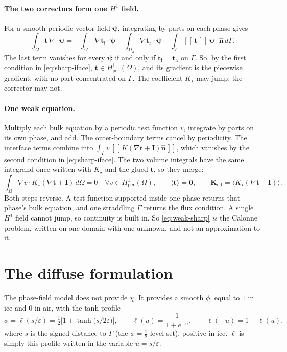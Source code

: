 \documentclass[11pt]{article}
\newcommand{\Om}{\Omega}
\newcommand{\Gam}{\Gamma}
\newcommand{\bn}{\hat{\mathbf n}}
\newcommand{\bI}{\mathbf I}
\newcommand{\bt}{\mathbf t}
\newcommand{\Keff}{\mathbf{K}_{\mathrm{eff}}}
\newcommand{\Hper}{H^1_{\mathrm{per}}(\Om)}
\newcommand{\avg}[1]{\big\langle #1 \big\rangle}
\newcommand{\jump}[1]{[\![\,#1\,]\!]}
\begin{document}
\paragraph{The two correctors form one $H^1$ field.} For a smooth periodic
vector field $\boldsymbol\psi$, integrating by parts on each phase gives
\[
\int_\Om\bt\,\nabla\!\cdot\boldsymbol\psi
=-\int_{\Om_{\mathrm i}}\nabla\bt_{\mathrm i}\cdot\boldsymbol\psi
 -\int_{\Om_{\mathrm a}}\nabla\bt_{\mathrm a}\cdot\boldsymbol\psi
 -\int_\Gam\jump{\bt}\,\boldsymbol\psi\cdot\bn\,d\Gam .
\]
The last term vanishes for every $\boldsymbol\psi$ if and only if
$\bt_{\mathrm i}=\bt_{\mathrm a}$ on $\Gam$. So, by the first condition in
\eqref{eq:sharp-iface}, $\bt\in\Hper$, and its gradient is the piecewise
gradient, with no part concentrated on $\Gam$. The coefficient $K_\star$ may
jump; the corrector may not.

\paragraph{One weak equation.} Multiply each bulk equation by a periodic test
function $v$, integrate by parts on its own phase, and add. The outer-boundary
terms cancel by periodicity. The interface terms combine into
$\int_\Gam v\,\jump{K(\nabla\bt+\bI)\bn}$, which vanishes by the second
condition in \eqref{eq:sharp-iface}. The two volume integrals have the same
integrand once written with $K_\star$ and the glued $\bt$, so they merge:
\begin{equation}
\int_\Om\nabla v\cdot K_\star(\nabla\bt+\bI)\,d\Om=0\quad\forall v\in\Hper,
\qquad \avg{\bt}=\mathbf 0,\qquad
\Keff=\avg{K_\star(\nabla\bt+\bI)} .
\label{eq:weak-sharp}
\end{equation}
Both steps reverse. A test function supported inside one phase returns that
phase's bulk equation, and one straddling $\Gam$ returns the flux condition. A
single $H^1$ field cannot jump, so continuity is built in. So
\eqref{eq:weak-sharp} \emph{is} the Calonne problem, written on one domain with
one unknown, and not an approximation to it.

\section{The diffuse formulation}
\label{sec:diffuse}

The phase-field model does not provide $\chi$. It provides a smooth $\phi$,
equal to $1$ in ice and $0$ in air, with the tanh profile
\begin{equation}
\phi=\ell(s/\varepsilon)=\tfrac12\big[1+\tanh\big(s/2\varepsilon\big)\big],
\qquad \ell(u)=\frac{1}{1+e^{-u}},\qquad \ell(-u)=1-\ell(u),
\label{eq:profile}
\end{equation}
where $s$ is the signed distance to $\Gam$ (the $\phi=\tfrac12$ level set),
positive in ice. $\ell$ is simply this profile written in the variable
$u=s/\varepsilon$.
\end{document}
